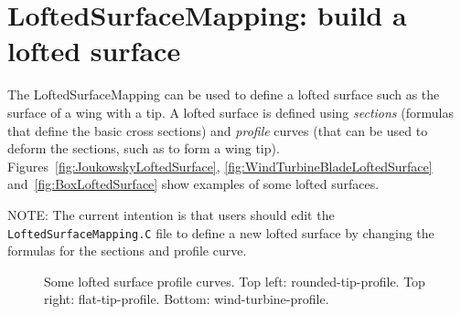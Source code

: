 \newcommand{\shat}{\hat{s}}

\section{LoftedSurfaceMapping: build a lofted surface}


The LoftedSurfaceMapping can be used to define a lofted surface such as the
surface of a wing with a tip.  A lofted surface is defined using {\em sections}
(formulas that define the basic cross sections) and {\em profile} curves (that
can be used to deform the sections, such as to form a wing tip).
Figures~\ref{fig:JoukowskyLoftedSurface},
\ref{fig:WindTurbineBladeLoftedSurface} and~\ref{fig:BoxLoftedSurface} show examples of some lofted
surfaces.  

NOTE: The current intention is that users should edit the {\tt
LoftedSurfaceMapping.C} file to define a new lofted surface by changing the
formulas for the sections and profile curve.

{
\newcommand{\figWidth}{8cm}
\newcommand{\trimfig}[2]{\trimPlot{#1}{#2}{.0}{.0}{.25}{.25}}
\newcommand{\figWidtha}{12cm}
\newcommand{\trimfiga}[2]{\trimPlot{#1}{#2}{.0}{.0}{.35}{.35}}
\begin{figure}[hbt]
\begin{center}
\end{center}
\caption{Some lofted surface profile curves. Top left: rounded-tip-profile. Top right: flat-tip-profile.
      Bottom: wind-turbine-profile.}
\label{fig:LoftedSurfaceProfileCruves}
\end{figure}
}


